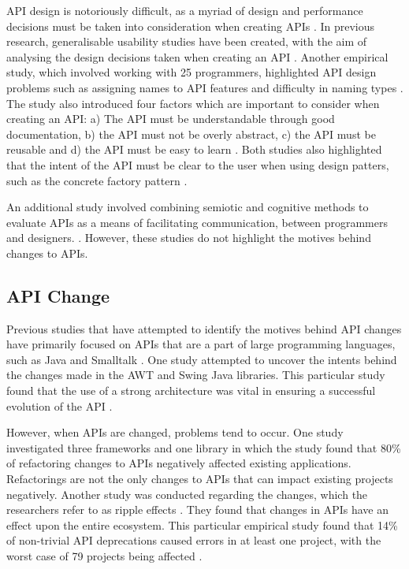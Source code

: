 \documentclass[10pt,twocolumn]{article}
\begin{document}
API design is notoriously difficult, as a myriad of design and performance decisions must be taken into consideration when creating APIs \cite{bloch2008effective} \cite{afonso2012evaluating} \cite{stylos2006comparing}. In previous research, generalisable usability studies have been created, with the aim of analysing the design decisions taken when creating an API \cite{stylos2006comparing}. Another empirical study, which involved working with 25 programmers, highlighted API design problems such as assigning names to API features and difficulty in naming types \cite{shi2011empirical}. The study also introduced four factors which are important to consider when creating an API: a) The API  must be understandable through good documentation, b) the API must not be overly abstract, c) the API must be reusable and d) the API must be easy to learn \cite{shi2011empirical}. Both studies also highlighted that the intent of the API must be clear to the user when using design patters, such as the concrete factory pattern \cite{shi2011empirical} \cite{stylos2006comparing}.

An additional study involved combining semiotic and cognitive methods to evaluate APIs as a means of facilitating communication, between programmers and designers. \cite{afonso2012evaluating}. However, these studies do not highlight the motives behind changes to APIs.

\subsection{API Change}
Previous studies that have attempted to identify the motives behind API changes have primarily focused on APIs that are a part of large programming languages, such as Java \cite{shi2011empirical} \cite{hou2011exploring} and Smalltalk \cite{robbes2012developers}. One study attempted to uncover the intents behind the changes made in the AWT and Swing Java libraries. This particular study found that the use of a strong architecture was vital in ensuring a successful evolution of the API \cite{hou2011exploring}.

However, when APIs are changed, problems tend to occur. One study \cite{dig2005role} investigated three frameworks and one library in which the study found that 80\% of refactoring changes to APIs negatively affected existing applications. Refactorings are not the only changes to APIs that can impact existing projects negatively. Another study was conducted regarding the changes, which the researchers refer to as ripple effects \cite{robbes2012developers}. They found that changes in APIs have an effect upon the entire ecosystem. This particular empirical study found that 14\% of non-trivial API deprecations caused errors in at least one project, with the worst case of 79 projects being affected \cite{robbes2012developers}.
\end{document}
